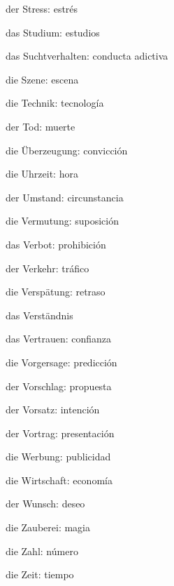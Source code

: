 \begin{multicols}{2}
\begin{myitemize}
\item der Stress: estrés
\item das Studium: estudios
\item das Suchtverhalten: conducta adictiva
\item die Szene: escena
\item die Technik: tecnología
\item der Tod: muerte
\item die Überzeugung: convicción
\item die Uhrzeit: hora
\item der Umstand: circunstancia
\item die Vermutung: suposición
\item das Verbot: prohibición
\item der Verkehr: tráfico
\item die Verspätung: retraso
\item das Verständnis
\item das Vertrauen: confianza
\item die Vorgersage: predicción
\item der Vorschlag: propuesta
\item der Vorsatz: intención
\item der Vortrag: presentación
\item die Werbung: publicidad
\item die Wirtschaft: economía
\item der Wunsch: deseo
\item die Zauberei: magia
\item die Zahl: número
\item die Zeit: tiempo
\end{myitemize}
\end{multicols}

